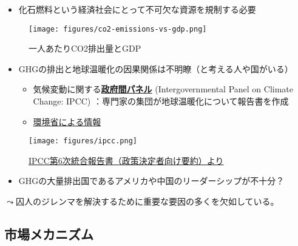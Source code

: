\documentclass[
  xelatex,
  ja=standard]{bxjsarticle}
\providecommand{\tightlist}{%
  \setlength{\itemsep}{0pt}\setlength{\parskip}{0pt}}\usepackage{longtable,booktabs,array}
\begin{document}
\begin{itemize}
\tightlist
\item
  化石燃料という経済社会にとって不可欠な資源を規制する必要
\end{itemize}

\begin{figure}[htpb]

{\centering \texttt{[image: figures/co2-emissions-vs-gdp.png]}

}

\caption{一人あたりCO2排出量とGDP}

\end{figure}

\begin{itemize}
\tightlist
\item
  GHGの排出と地球温暖化の因果関係は不明瞭（と考える人や国がいる）

  \begin{itemize}
  \tightlist
  \item
    気候変動に関する\href{https://www.data.jma.go.jp/cpdinfo/ipcc/index.html}{\textbf{政府間パネル}}
    (Intergovernmental Panel on Climate Change: IPCC)
    ：専門家の集団が地球温暖化について報告書を作成
  \item
    \href{https://www.env.go.jp/earth/ondanka/knowledge.html}{環境省による情報}
  \end{itemize}
\end{itemize}

\begin{figure}[htpb]

{\centering \texttt{[image: figures/ipcc.png]}

}

\caption{\href{https://www.ipcc.ch/report/sixth-assessment-report-cycle/}{IPCC第6次統合報告書（政策決定者向け要約）より}}

\end{figure}

\begin{itemize}
\tightlist
\item
  GHGの大量排出国であるアメリカや中国のリーダーシップが不十分？
\end{itemize}

\(\leadsto\)囚人のジレンマを解決するために重要な要因の多くを欠如している。

\hypertarget{ux5e02ux5834ux30e1ux30abux30cbux30baux30e0}{%
\subsection{市場メカニズム}\label{ux5e02ux5834ux30e1ux30abux30cbux30baux30e0}}
\end{document}
